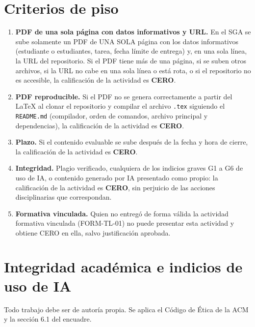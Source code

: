 \documentclass[11pt]{article}
\newcommand{\seccion}[1]{\section{\textcolor{utegreendk}{#1}}}
\begin{document}
\seccion{Criterios de piso}

\begin{cajapiso}[title={Criterios de piso: su incumplimiento implica calificación CERO en la actividad}]
	\begin{enumerate}[label=\textbf{P\arabic*.},leftmargin=24pt,itemsep=3pt]
		\item \textbf{PDF de una sola página con datos informativos y URL.} En el SGA se sube solamente un PDF de UNA SOLA página con los datos informativos (estudiante o estudiantes, tarea, fecha límite de entrega) y, en una sola línea, la URL del repositorio. Si el PDF tiene más de una página, si se suben otros archivos, si la URL no cabe en una sola línea o está rota, o si el repositorio no es accesible, la calificación de la actividad es \textbf{CERO}.
		\item \textbf{PDF reproducible.} Si el PDF no se genera correctamente a partir del \LaTeX{} al clonar el repositorio y compilar el archivo \texttt{.tex} siguiendo el \texttt{README.md} (compilador, orden de comandos, archivo principal y dependencias), la calificación de la actividad es \textbf{CERO}.
		\item \textbf{Plazo.} Si el contenido evaluable se sube después de la fecha y hora de cierre, la calificación de la actividad es \textbf{CERO}.
		\item \textbf{Integridad.} Plagio verificado, cualquiera de los indicios graves G1 a G6 de uso de IA, o contenido generado por IA presentado como propio: la calificación de la actividad es \textbf{CERO}, sin perjuicio de las acciones disciplinarias que correspondan.
		\item \textbf{Formativa vinculada.} Quien no entregó de forma válida la actividad formativa vinculada (FORM-TL-01) no puede presentar esta actividad y obtiene CERO en ella, salvo justificación aprobada.
	\end{enumerate}
\end{cajapiso}

\seccion{Integridad académica e indicios de uso de IA}

Todo trabajo debe ser de autoría propia. Se aplica el Código de Ética de la ACM \citep{acm_code_2018} y la sección 6.1 del encuadre.
\end{document}
